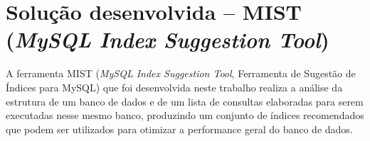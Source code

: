 \chapter{Solução desenvolvida -- MIST (\textit{MySQL Index Suggestion Tool})}
\label{solucao-desenvolvida}

A ferramenta MIST (\textit{MySQL Index Suggestion Tool}, Ferramenta de Sugestão de Índices para MySQL) que foi desenvolvida neste trabalho realiza a análise da estrutura de um banco de dados e de um lista de consultas elaboradas para serem executadas nesse mesmo banco, produzindo um conjunto de índices recomendados que podem ser utilizados para otimizar a performance geral do banco de dados.









